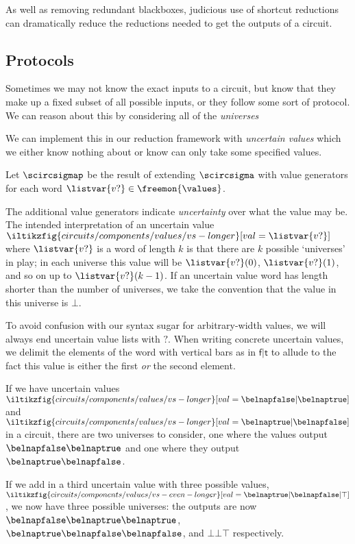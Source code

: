 As well as removing redundant blackboxes, judicious use of shortcut
reductions can dramatically reduce the reductions needed to get the outputs of a
circuit.

\subsection{Protocols}

Sometimes we may not know the exact inputs to a circuit, but know that they make
up a fixed subset of all possible inputs, or they follow some sort of protocol.
We can reason about this by considering all of the \emph{universes}


We can implement this in our reduction framework with \emph{uncertain values}
which we either know nothing about or know can only take some specified values.

\begin{definition}
    Let \(\scircsigmap\) be the result of extending \(\scircsigma\) with value
    generators for each word \(\listvar{v?} \in \freemon{\values}\).
\end{definition}

The additional value generators indicate \emph{uncertainty} over what the value
may be.
The intended interpretation of an uncertain value \(
\iltikzfig{circuits/components/values/vs-longer}[val=\listvar{v?}]
\) where \(\listvar{v?}\) is a word of length \(k\) is that there are \(k\)
possible `universes' in play; in each universe this value will be
\(\listvar{v?}(0)\), \(\listvar{v?}(1)\), and so on up to \(\listvar{v?}(k-1)\).
If an uncertain value word has length shorter than the number of universes, we
take the convention that the value in this universe is \(\bot\).

To avoid confusion with our syntax sugar for arbitrary-width values, we will
always end uncertain value lists with \(?\).
When writing concrete uncertain values, we delimit the elements of the word with
vertical bars as in \(\mathsf{f}|\mathsf{t}\) to allude to the fact this value
is either the first \emph{or} the second element.

\begin{example}
    If we have uncertain values \(
    \iltikzfig{circuits/components/values/vs-longer}[val=\belnapfalse|\belnaptrue]
    \) and \(
    \iltikzfig{circuits/components/values/vs-longer}[val=\belnaptrue|\belnapfalse]
    \) in a circuit, there are two universes to consider, one where the
    values output \(\belnapfalse\belnaptrue\) and one where they output
    \(\belnaptrue\belnapfalse\).

    If we add in a third uncertain value with three possible values, \(
    \iltikzfig{circuits/components/values/vs-even-longer}[val=\belnaptrue|\belnapfalse|\top]
    \), we now have three possible universes: the outputs are now
    \(\belnapfalse\belnaptrue\belnaptrue\),
    \(\belnaptrue\belnapfalse\belnapfalse\), and
    \(\bot\bot\top\) respectively.
\end{example}

